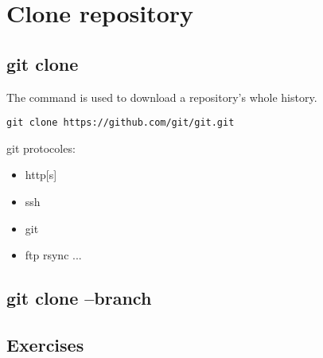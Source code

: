 \section{Clone repository}
\begin{frame}[fragile]
    \slidetitle
\end{frame}

\subsection{git clone}
\begin{frame}[fragile]
  \subslidetitle
  The command  is used to download a repository's whole history.
  \begin{lstlisting}
git clone https://github.com/git/git.git
  \end{lstlisting}

git protocoles:
\begin{itemize}
\item http[s]
\item ssh
\item git
\item ftp rsync ...
\end{itemize}
\end{frame}

\subsection{git clone --branch}
\begin{frame}[fragile]
  \subslidetitle
\end{frame}

\subsection{Exercises}
\begin{frame}[fragile]
  \subslidetitle
\end{frame}
